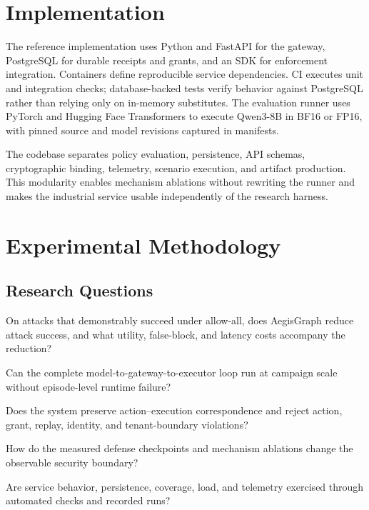 \documentclass[10pt,twocolumn]{article}
\begin{document}
\section{Implementation}
The reference implementation uses Python and FastAPI for the gateway, PostgreSQL for durable receipts and grants, and an SDK for enforcement integration. Containers define reproducible service dependencies. CI executes unit and integration checks; database-backed tests verify behavior against PostgreSQL rather than relying only on in-memory substitutes. The evaluation runner uses PyTorch and Hugging Face Transformers to execute Qwen3-8B in BF16 or FP16, with pinned source and model revisions captured in manifests.

The codebase separates policy evaluation, persistence, API schemas, cryptographic binding, telemetry, scenario execution, and artifact production. This modularity enables mechanism ablations without rewriting the runner and makes the industrial service usable independently of the research harness.

\section{Experimental Methodology}
\subsection{Research Questions}
\begin{description}[style=nextline]
  \item[RQ1: Security effectiveness.] On attacks that demonstrably succeed under allow-all, does AegisGraph reduce attack success, and what utility, false-block, and latency costs accompany the reduction?
  \item[RQ2: Runtime reliability.] Can the complete model-to-gateway-to-executor loop run at campaign scale without episode-level runtime failure?
  \item[RQ3: Evidence integrity.] Does the system preserve action--execution correspondence and reject action, grant, replay, identity, and tenant-boundary violations?
  \item[RQ4: Version and mechanism evidence.] How do the measured defense checkpoints and mechanism ablations change the observable security boundary?
  \item[RQ5: Industrial readiness.] Are service behavior, persistence, coverage, load, and telemetry exercised through automated checks and recorded runs?
\end{description}
\end{document}
